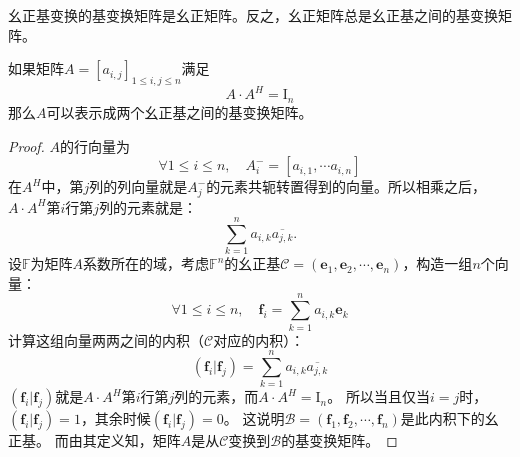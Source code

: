 \documentclass[12pt,UTF8]{ctexbook}
\begin{document}
幺正基变换的基变换矩阵是幺正矩阵。反之，幺正矩阵总是幺正基之间的基变换矩阵。
\begin{pp}\label{pp:8_1}
    如果矩阵$A = [a_{i,j}]_{1\leqslant i , j \leqslant n}$满足
    $$ A \cdot A^H = \mathrm{I}_n$$
    那么$A$可以表示成两个幺正基之间的基变换矩阵。
\end{pp}
\begin{proof} %
    $A$的行向量为
    $$ \forall 1\leqslant i \leqslant n, \quad A_i^- = [a_{i,1}, \cdots a_{i,n}]$$
    在$A^H$中，第$j$列的列向量就是$A_j^-$的元素共轭转置得到的向量。所以相乘之后，$ A \cdot A^H$第$i$行第$j$列的元素就是：
    $$ \sum_{k=1}^n a_{i,k} \overline{a_{j,k}}. $$
    设$\mathbb{F}$为矩阵$A$系数所在的域，考虑$\mathbb{F}^n$的幺正基$ \mathcal{C} = (\mathbf{e}_1, \mathbf{e}_2, \cdots , \mathbf{e}_n )$，构造一组$n$个向量：
    $$ \forall 1\leqslant i \leqslant n, \quad \mathbf{f}_i = \sum_{k=1}^n a_{i,k} \mathbf{e}_k $$
    计算这组向量两两之间的内积（$ \mathcal{C} $对应的内积）：
    $$ (\mathbf{f}_i | \mathbf{f}_j ) = \sum_{k=1}^n a_{i,k} \overline{a_{j,k}} $$
    $ (\mathbf{f}_i | \mathbf{f}_j )$就是$ A \cdot A^H$第$i$行第$j$列的元素，而$ A \cdot A^H = \mathrm{I}_n$。
    所以当且仅当$i = j$时，$ (\mathbf{f}_i | \mathbf{f}_j ) = 1$，其余时候$ (\mathbf{f}_i | \mathbf{f}_j ) = 0$。
    这说明$\mathcal{B} = (\mathbf{f}_1, \mathbf{f}_2, \cdots , \mathbf{f}_n )$是此内积下的幺正基。
    而由其定义知，矩阵$A$是从$ \mathcal{C} $变换到$ \mathcal{B} $的基变换矩阵。

\end{proof}
\end{document}
